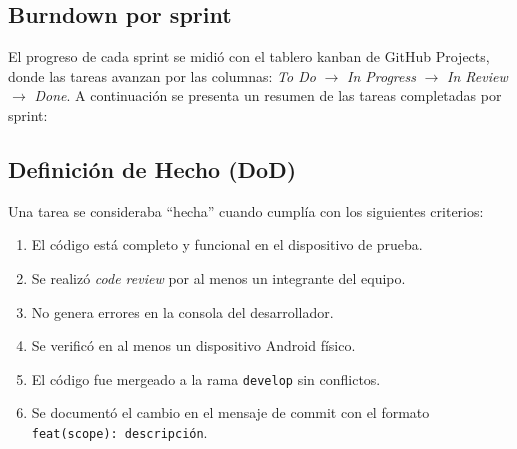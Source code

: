 \subsection{Burndown por sprint}

El progreso de cada sprint se midió con el tablero kanban de GitHub Projects,
donde las tareas avanzan por las columnas: \textit{To Do} $\rightarrow$
\textit{In Progress} $\rightarrow$ \textit{In Review} $\rightarrow$
\textit{Done}. A continuación se presenta un resumen de las tareas completadas
por sprint:

\begin{table}[H]
  \centering
  \caption{Tareas completadas por sprint}
\end{table}

\subsection{Definición de Hecho (DoD)}

Una tarea se consideraba ``hecha'' cuando cumplía con los siguientes criterios:

\begin{enumerate}
  \item El código está completo y funcional en el dispositivo de prueba.
  \item Se realizó \textit{code review} por al menos un integrante del equipo.
  \item No genera errores en la consola del desarrollador.
  \item Se verificó en al menos un dispositivo Android físico.
  \item El código fue mergeado a la rama \texttt{develop} sin conflictos.
  \item Se documentó el cambio en el mensaje de commit con el formato
    \texttt{feat(scope): descripción}.
\end{enumerate}

